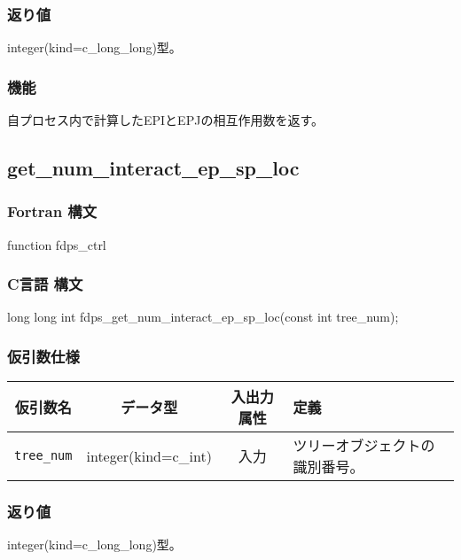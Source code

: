 \subsubsection*{返り値}
integer(kind=c\_long\_long)型。

\subsubsection*{機能}
自プロセス内で計算したEPIとEPJの相互作用数を返す。
\clearpage

\subsection{get\_num\_interact\_ep\_sp\_loc}
\subsubsection*{Fortran 構文}
\begin{screen}
\begin{spverbatim}
function fdps_ctrl%
\end{spverbatim}
\end{screen}

\subsubsection*{C言語 構文}
\begin{screen}
\begin{spverbatim}
long long int fdps_get_num_interact_ep_sp_loc(const int tree_num); 
\end{spverbatim}
\end{screen}

\subsubsection*{仮引数仕様}
\begin{table}[h]
\begin{tabularx}{\linewidth}{cccX}
\toprule
\rowcolor{Snow2}
仮引数名 & データ型 & 入出力属性 & 定義 \\
\midrule
\verb|tree_num|  & integer(kind=c\_int)   & 入力     & ツリーオブジェクトの識別番号。\\
\bottomrule
\end{tabularx}
\end{table}

\subsubsection*{返り値}
integer(kind=c\_long\_long)型。

